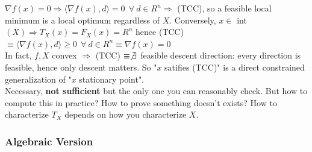 \documentclass[10pt]{report}
\begin{document}
$\nabla f(x) = 0\Rightarrow \langle\nabla f(x),d\rangle = 0\:\:\forall\:d\in R^n \Rightarrow$ (TCC), so a feasible local minimum is a local optimum regardless of $X$. Conversely, $x\in$ int$(X)\Rightarrow T_X(x) = F_X(x) = R^n$ hence (TCC) $\equiv\langle\nabla f(x),d\rangle \geq 0\:\:\forall\:d\in R^n\equiv \nabla f(x) = 0$\\
In fact, $f,X$ convex $\Rightarrow$ (TCC) $\equiv \not\exists$ feasible descent direction: every direction is feasible, hence only descent matters. So "$x$ satifies (TCC)" is a direct constrained generalization of "$x$ stationary point".\\
Necessary, \textbf{not sufficient} but the only one you can reasonably check. But how to compute this in practice? How to prove something doesn't exists? How to characterize $T_X$ depends on how you characterize $X$.
\subsubsection{Algebraic Version}
\end{document}
